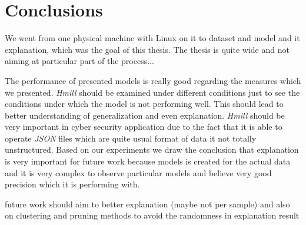 \chapter{Conclusions} \label{chap:concl}
 We went from one physical machine with Linux on it to dataset and model and it explanation, which was the goal of this thesis. The thesis is quite wide and not aiming at particular part of the process...



The performance of presented models is really good regarding the measures which we presented. \emph{Hmill} should be examined under different conditions just to see the conditions under which the model is not performing well. This should lead to better understanding of generalization and even explanation. \emph{Hmill} should be very important in cyber security application due to the fact that it is able to operate \emph{JSON} files which are quite usual format of data it not totally unstructured. Based on our experiments we draw the conclusion that explanation is very important for future work because models is created for the actual data and it is very complex to observe particular models and believe very good precision which it is performing with.

future work should aim to better explanation (maybe not per sample) and also on clustering and pruning methods to avoid the randomness in explanation result